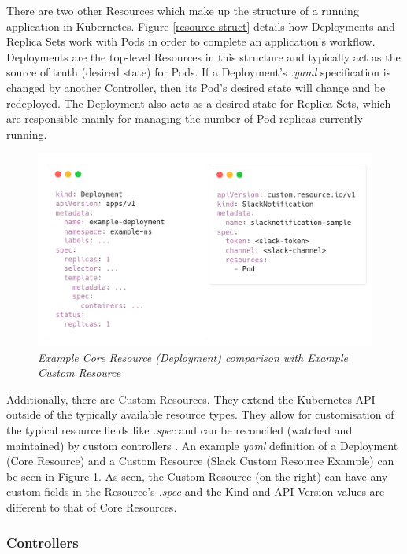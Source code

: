 \documentclass{article}
\begin{document}
There are two other Resources which make up the structure of a running application in Kubernetes. Figure \ref{resource-struct} \cite{k8s-rolling} details how Deployments and Replica Sets work with Pods in order to complete an application's workflow. Deployments are the top-level Resources in this structure and typically act as the source of truth (desired state) for Pods. If a Deployment's \emph{.yaml} specification is changed by another Controller, then its Pod's desired state will change and be redeployed. The Deployment also acts as a desired state for Replica Sets, which are responsible mainly for managing the number of Pod replicas currently running. 

\begin{figure}[H]
    \centering
    \includegraphics[width=125mm]{tech/core-cr.png}
    \caption{\emph{Example Core Resource (Deployment) comparison with Example Custom Resource}}
    \label{core-cr}
\end{figure}

Additionally, there are Custom Resources. They extend the Kubernetes API outside of the typically available resource types. They allow for customisation of the typical resource fields like \emph{.spec} and can be reconciled (watched and maintained) by custom controllers \cite{cust-res}. An example \emph{yaml} definition of a Deployment (Core Resource) and a Custom Resource (Slack Custom Resource Example) can be seen in Figure \ref{core-cr}. As seen, the Custom Resource (on the right) can have any custom fields in the Resource's \emph{.spec} and the Kind and API Version values are different to that of Core Resources.



\subsubsection{Controllers} \label{controllers}
\end{document}
